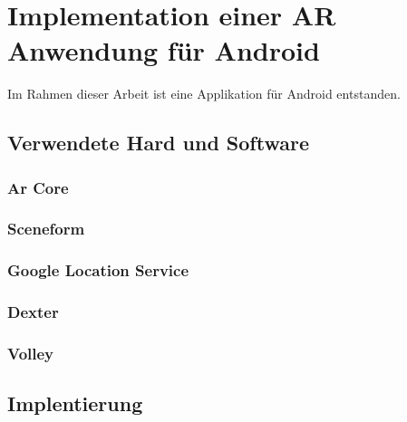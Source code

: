 \chapter{Implementation einer AR Anwendung für Android}

Im Rahmen dieser Arbeit ist eine Applikation für Android entstanden.

\section{Verwendete Hard und Software}

\subsection{Ar Core}

\subsection{Sceneform}

\subsection{Google Location Service}

\subsection{Dexter}

\subsection{Volley}

\section{Implentierung}



